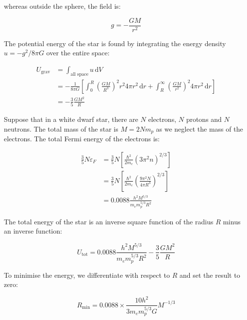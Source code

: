 \documentclass[12pt]{article}
\begin{document}
whereas outside the sphere, the field is:

\begin{equation}
    g = -\frac{GM}{r^{2}}
\end{equation}

The potential energy of the star is found by integrating the energy density $u = -g^{2}/8\pi G$ over the entire space:

\begin{equation}
    \begin{split}
        U_{\text{grav}} &= \int_{\text{all space}} u \, \mathrm{d}V \\
        &= -\frac{1}{8\pi G} \left[ \int_{0}^{R} \left( \frac{GM}{R^{3}} \right)^{2} r^{2} 4\pi r^{2} \, \mathrm{d}r + \int_{R}^{\infty} \left( \frac{GM}{r^{2}} \right)^{2} 4\pi r^{2} \, \mathrm{d}r \right] \\
        &= -\frac{3}{5} \frac{GM^{2}}{R}
    \end{split}
\end{equation}

Suppose that in a white dwarf star, there are $N$ electrons, $N$ protons and $N$ neutrons. The total mass of the star is $M = 2Nm_{p}$ as we neglect the mass of the electrons. The total Fermi energy of the electrons is:

\begin{equation}
    \begin{split}
        \frac{3}{5} N \varepsilon_{F} &= \frac{3}{5} N \left[ \frac{\hbar^{2}}{2m_{e}} \left( 3\pi^{2} n \right)^{2/3} \right] \\
        &= \frac{3}{5} N \left[ \frac{\hbar^{2}}{2m_{e}} \left( \frac{9\pi^{2} N}{4\pi R^{3}} \right)^{2/3} \right] \\
        &= 0.0088 \frac{h^{2}M^{5/3}}{m_{e}m_{p}^{5/3}R^{2}}
    \end{split}
\end{equation}

The total energy of the star is an inverse square function of the radius $R$ minus an inverse function:

\begin{equation}
    U_{\text{tot}} = 0.0088 \frac{h^{2}M^{5/3}}{m_{e}m_{p}^{5/3}R^{2}} - \frac{3}{5} \frac{GM^{2}}{R}
\end{equation}

To minimise the energy, we differentiate with respect to $R$ and set the result to zero:

\begin{equation}
    R_{\text{min}} = 0.0088 \times \frac{10h^{2}}{3m_{e}m_{p}^{5/3}G} M^{-1/3}
\end{equation}
\end{document}
